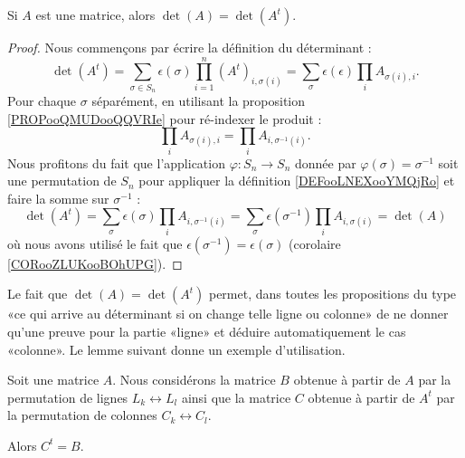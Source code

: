 \begin{lemma}        \label{LEMooCEQYooYAbctZ}
	Si \( A\) est une matrice, alors \( \det(A)=\det(A^t)\).
\end{lemma}

\begin{proof}
	Nous commençons par écrire la définition du déterminant :
	\begin{equation}
		\det(A^t)=\sum_{\sigma\in S_n}\epsilon(\sigma)\prod_{i=1}^n(A^t)_{i,\sigma(i)}=\sum_{\sigma}\epsilon(\epsilon)\prod_iA_{\sigma(i),i}.
	\end{equation}
	Pour chaque \( \sigma\) séparément, en utilisant la proposition \ref{PROPooQMUDooQQVRIe} pour ré-indexer le produit :
	\begin{equation}
		\prod_i A_{\sigma(i),i}=\prod_iA_{i,\sigma^{-1}(i)}.
	\end{equation}
	Nous profitons du fait que l'application \( \varphi\colon S_n\to S_n\) donnée par \( \varphi(\sigma)=\sigma^{-1}\) soit une permutation de \( S_n\) pour appliquer la définition \ref{DEFooLNEXooYMQjRo} et faire la somme sur \( \sigma^{-1}\) :
	\begin{equation}
		\det(A^t)=\sum_{\sigma}\epsilon(\sigma)\prod_iA_{i,\sigma^{-1}(i)}=\sum_{\sigma}\epsilon(\sigma^{-1})\prod_iA_{i,\sigma(i)}=\det(A)
	\end{equation}
	où nous avons utilisé le fait que \(\epsilon(\sigma^{-1})=\epsilon(\sigma)\) (corolaire \ref{CORooZLUKooBOhUPG}).
\end{proof}

Le fait que \( \det(A)=\det(A^t)\) permet, dans toutes les propositions du type «ce qui arrive au déterminant si on change telle ligne ou colonne» de ne donner qu'une preuve pour la partie «ligne» et déduire automatiquement le cas «colonne». Le lemme suivant donne un exemple d'utilisation.

\begin{lemma}        \label{LEMooWMQWooGWFlmC}
	Soit une matrice \( A\). Nous considérons la matrice \( B\) obtenue à partir de \( A\) par la permutation de lignes \( L_k\leftrightarrow L_l\) ainsi que la matrice \( C\) obtenue à partir de \( A^t\) par la permutation de colonnes \( C_k\leftrightarrow C_l\).

	Alors \( C^t=B\).
\end{lemma}

